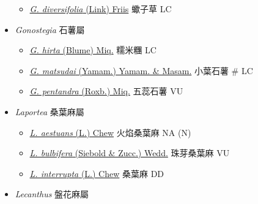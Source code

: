 \begin{itemize}
  \begin{itemize}
        \item[] \href{http://www.theplantlist.org/tpl1.1/search?q=Girardinia+diversifolia}{\textit{G. diversifolia} (Link) Friis}   蠍子草   LC
  \end{itemize}
 \item[] \textit{Gonostegia} 石薯屬
                                
  \begin{itemize}
        \item[] \href{http://www.theplantlist.org/tpl1.1/search?q=Gonostegia+hirta}{\textit{G. hirta} (Blume) Miq.}   糯米糰   LC
        \item[] \href{http://www.theplantlist.org/tpl1.1/search?q=Gonostegia+matsudai}{\textit{G. matsudai} (Yamam.) Yamam. \& Masam.}   小葉石薯  \# LC
        \item[] \href{http://www.theplantlist.org/tpl1.1/search?q=Gonostegia+pentandra}{\textit{G. pentandra} (Roxb.) Miq.}   五蕊石薯   VU
  \end{itemize}
 \item[] \textit{Laportea} 桑葉麻屬
                                
  \begin{itemize}
        \item[] \href{http://www.theplantlist.org/tpl1.1/search?q=Laportea+aestuans}{\textit{L. aestuans} (L.) Chew}   火焰桑葉麻   NA (N)
        \item[] \href{http://www.theplantlist.org/tpl1.1/search?q=Laportea+bulbifera}{\textit{L. bulbifera} (Siebold \& Zucc.) Wedd.}   珠芽桑葉麻   VU
        \item[] \href{http://www.theplantlist.org/tpl1.1/search?q=Laportea+interrupta}{\textit{L. interrupta} (L.) Chew}   桑葉麻   DD
  \end{itemize}
 \item[] \textit{Lecanthus} 盤花麻屬
                                

\end{itemize}

